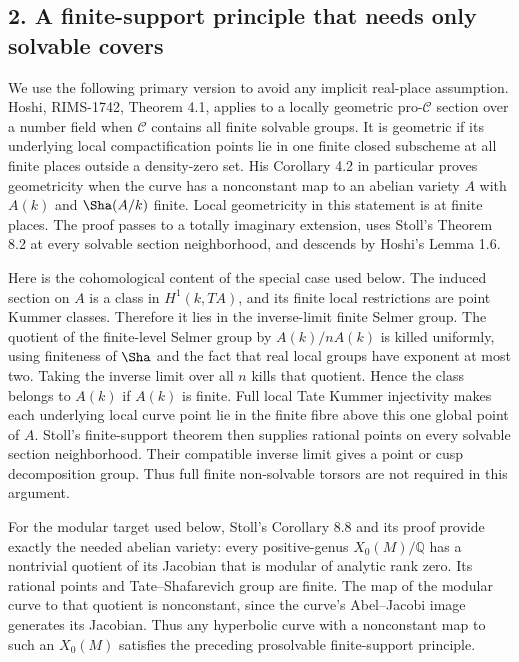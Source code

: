 \subsection*{2. A finite-support principle that needs only solvable covers}

We use the following primary version to avoid any implicit real-place
assumption.  Hoshi, RIMS-1742, Theorem 4.1, applies to a locally
geometric pro-$\mathcal C$ section over a number field when
$\mathcal C$ contains all finite solvable groups.  It is geometric
if its underlying local compactification points lie in one finite
closed subscheme at all finite places outside a density-zero set.
His Corollary 4.2 in particular proves geometricity when the curve
has a nonconstant map to an abelian variety $A$ with $A(k)$ and
$\Sha(A/k)$ finite.  Local geometricity in this statement is at
finite places.  The proof passes to a totally imaginary extension,
uses Stoll's Theorem 8.2 at every solvable section neighborhood,
and descends by Hoshi's Lemma 1.6.

Here is the cohomological content of the special case used below.
The induced section on $A$ is a class in
$H^1(k,T A)$, and its finite local restrictions are point Kummer
classes.  Therefore it lies in the inverse-limit finite Selmer
group.  The quotient of the finite-level Selmer group by
$A(k)/nA(k)$ is killed uniformly, using finiteness of $\Sha$ and
the fact that real local groups have exponent at most two.
Taking the inverse limit over all $n$ kills that quotient.  Hence
the class belongs to $A(k)$ if $A(k)$ is finite.  Full local Tate
Kummer injectivity makes each underlying local curve point lie in
the finite fibre above this one global point of $A$.  Stoll's
finite-support theorem then supplies rational points on every
solvable section neighborhood.  Their compatible inverse limit
gives a point or cusp decomposition group.  Thus full finite
non-solvable torsors are not required in this argument.

For the modular target used below, Stoll's Corollary 8.8 and its
proof provide exactly the needed abelian variety: every
positive-genus $X_0(M)/\mathbb Q$ has a nontrivial quotient of its
Jacobian that is modular of analytic rank zero.  Its rational
points and Tate--Shafarevich group are finite.  The map of the
modular curve to that quotient is nonconstant, since the curve's
Abel--Jacobi image generates its Jacobian.  Thus any hyperbolic
curve with a nonconstant map to such an $X_0(M)$ satisfies the
preceding prosolvable finite-support principle.

